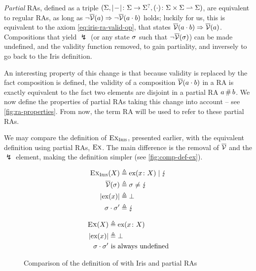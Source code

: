 \emph{Partial} RAs, defined as a triple $(\Sigma, |\!-\!|\colon \Sigma\rightarrow \Sigma^?, (\cdot)\colon \Sigma\times \Sigma \rightharpoonup \Sigma)$, are equivalent to regular RAs, as long as ${\neg\overline{\cal V}(a)\Rightarrow \neg\overline{\cal V}(a\cdot b)}$ holds; luckily for us, this is equivalent to the axiom \eqref{eq:iris-ra-valid-op}, that states $\overline{\cal V}(a\cdot b)\Rightarrow \overline{\cal V}(a)$. Compositions that yield $\lightning$ (or any state $\sigma$ such that $\neg\overline{\cal V}(\sigma)$) can be made undefined, and the validity function removed, to gain partiality, and inversely to go back to the Iris definition.

An interesting property of this change is that because validity is replaced by the fact composition is defined, the validity of a composition $\overline{\cal V}(a\cdot b)$ in a RA is exactly equivalent to the fact two elements are disjoint in a partial RA $a \operatorname{\#} b$. We now define the properties of partial RAs taking this change into account -- see \autoref{fig:ra-properties}. From now, the term RA will be used to refer to these partial RAs.

We may compare the definition of $\textsc{Ex}_{\textsc{Iris}}$, presented earlier, with the equivalent definition using partial RAs, $\textsc{Ex}$. The main difference is the removal of $\overline{\cal V}$ and the $\lightning$ element, making the definition simpler (see \autoref{fig:comp-def-ex}).

\begin{figure}
\noindent\begin{minipage}{.5\linewidth}
\begin{align*}
	\textsc{Ex}_{\textsc{Iris}}(X) &\triangleq \text{ex}(x\colon X) \mid \lightning \\
	\overline{\cal V}(\sigma) &\triangleq \sigma \neq \lightning \\
	|\text{ex}(x)| &\triangleq \bot\\
	\sigma \cdot \sigma' &\triangleq \lightning
\end{align*}\end{minipage}%
\begin{minipage}{.5\linewidth}
\begin{align*}
	\textsc{Ex}(X) &\triangleq \text{ex}(x\colon X) \\
	|\text{ex}(x)| &\triangleq \bot\\
	\sigma \cdot \sigma' & \text{ is always undefined}
\end{align*}\end{minipage}
\caption{Comparison of the definition of \Ex{} with Iris and partial RAs}
\label{fig:comp-def-ex}
\end{figure}


